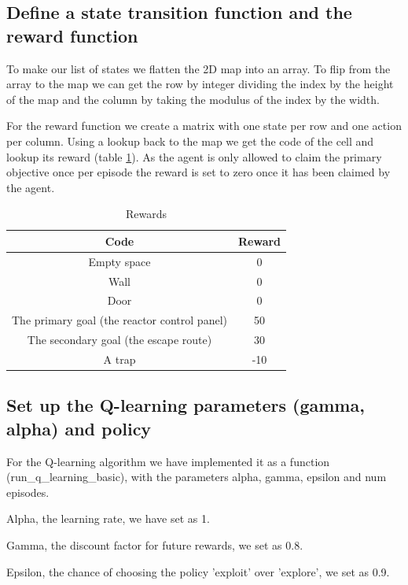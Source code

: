 \documentclass[a4pape, 11pt, english]{article}
\begin{document}
\subsection{Define a state transition function and the reward function}
To make our list of states we flatten the 2D map into an array. To flip from the array to the map we can get the row by integer dividing the index by the height of the map and the column by taking the modulus of the index by the width.

For the reward function we create a matrix with one state per row and one action per column. Using a lookup back to the map we get the code of the cell and lookup its reward (table \ref{tab:table1}). As the agent is only allowed to claim the primary objective once per episode the reward is set to zero once it has been claimed by the agent.

\begin{table}[h!]%
	\begin{center}
		\caption{Rewards}
		\label{tab:table1}
		\begin{tabular}{|c|c|}
			\hline
			\textbf{Code} & \textbf{Reward} \\
			\hline
			Empty space & 0 \\
			\hline
			Wall & 0 \\
			\hline
			Door & 0 \\
			\hline
			The primary goal (the reactor control panel) & 50 \\
			\hline
			The secondary goal (the escape route) & 30 \\
			\hline
			A trap & -10 \\
			\hline
		\end{tabular}
	\end{center}
\end{table}



\subsection{Set up the Q-learning parameters (gamma, alpha) and policy}
For the Q-learning algorithm we have implemented it as a function (run\_q\_learning\_basic), with the parameters alpha, gamma, epsilon and num episodes.

Alpha, the learning rate, we have set as 1.

Gamma, the discount factor for future rewards, we set as 0.8.

Epsilon, the chance of choosing the policy 'exploit' over 'explore', we set as 0.9.
\end{document}
